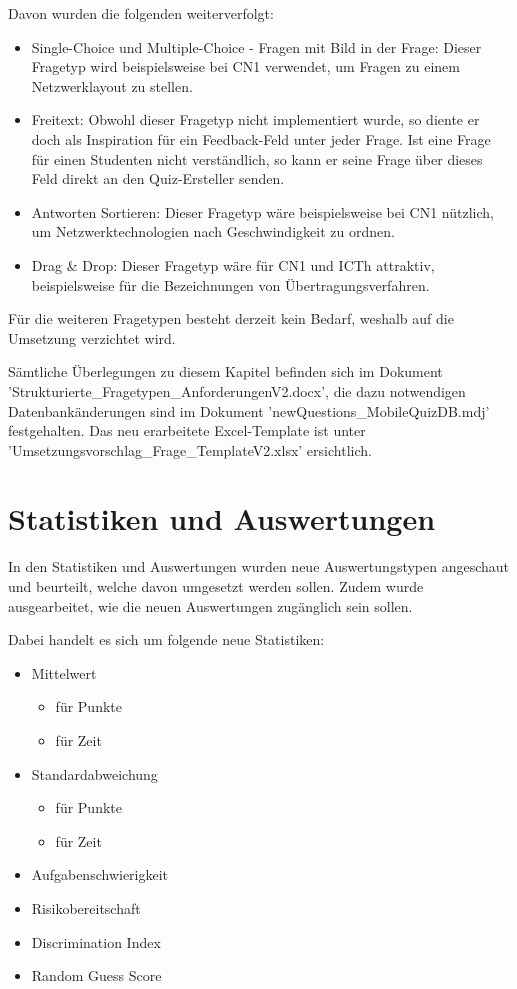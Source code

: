 \bigskip

Davon wurden die folgenden weiterverfolgt:
\begin{itemize}
	\item Single-Choice und Multiple-Choice - Fragen mit Bild in der Frage:
	Dieser Fragetyp wird beispielsweise bei \acrshort{CN1} verwendet, um Fragen zu einem Netzwerklayout zu stellen.
	\item Freitext:
	Obwohl dieser Fragetyp nicht implementiert wurde, so diente er doch als Inspiration für ein Feedback-Feld unter jeder Frage. Ist eine Frage für einen Studenten nicht verständlich, so kann er seine Frage über dieses Feld direkt an den Quiz-Ersteller senden.
	\item Antworten Sortieren:
	Dieser Fragetyp wäre beispielsweise bei \acrshort{CN1} nützlich, um Netzwerktechnologien nach Geschwindigkeit zu ordnen.
	\item Drag \& Drop:
	Dieser Fragetyp wäre für \acrshort{CN1} und \acrshort{ICTh} attraktiv, beispielsweise für die Bezeichnungen von Übertragungsverfahren.
\end{itemize}

\noindent Für die weiteren Fragetypen besteht derzeit kein Bedarf, weshalb auf die Umsetzung verzichtet wird.

\bigskip

Sämtliche Überlegungen zu diesem Kapitel befinden sich im Dokument \\ 'Strukturierte\_Fragetypen\_AnforderungenV2.docx', die dazu notwendigen Datenbankänderungen sind im Dokument 'newQuestions\_MobileQuizDB.mdj' festgehalten.
Das neu erarbeitete Excel-Template ist unter 'Umsetzungsvorschlag\_Frage\_TemplateV2.xlsx' ersichtlich.

\section{Statistiken und Auswertungen}
In den Statistiken und Auswertungen wurden neue Auswertungstypen angeschaut und beurteilt, welche davon umgesetzt werden sollen. Zudem wurde ausgearbeitet, wie die neuen Auswertungen zugänglich sein sollen.

\bigskip

\noindent Dabei handelt es sich um folgende neue Statistiken:
\begin{itemize}
	\item Mittelwert
	\begin{itemize}
		\item für Punkte
		\item für Zeit
	\end{itemize}
	\item Standardabweichung
	\begin{itemize}
		\item für Punkte
		\item für Zeit
	\end{itemize}
	\item Aufgabenschwierigkeit
	\item Risikobereitschaft
	\item Discrimination Index
	\item Random Guess Score
\end{itemize}

